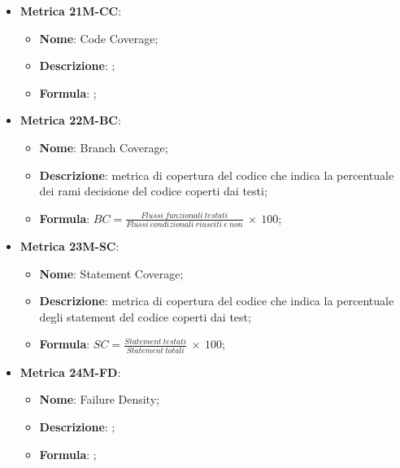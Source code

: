\begin{itemize}
    \item \textbf{Metrica 21M-CC}:
    \begin{itemize}
        \item \textbf{Nome}: Code Coverage;
        \item \textbf{Descrizione}: ;
        \item \textbf{Formula}: ;
    \end{itemize}
\end{itemize}

\begin{itemize}
    \item \textbf{Metrica 22M-BC}:
    \begin{itemize}
        \item \textbf{Nome}: Branch Coverage;
        \item \textbf{Descrizione}: metrica di copertura del codice che indica la percentuale dei rami decisione del codice coperti dai testi;
        \item \textbf{Formula}: $BC =\frac{Flussi\:funzionali\: testati}{Flussi\:condizionali\: riusciti\: e\: non}\: \times \: 100$;
    \end{itemize}
\end{itemize}

\begin{itemize}
    \item \textbf{Metrica 23M-SC}:
    \begin{itemize}
        \item \textbf{Nome}: Statement Coverage;
        \item \textbf{Descrizione}: metrica di copertura del codice che indica la percentuale degli statement del codice coperti dai test;
        \item \textbf{Formula}: $SC = \frac{Statement\: testati}{Statement\: totali}\: \times \: 100$;
    \end{itemize}
\end{itemize}

\begin{itemize}
    \item \textbf{Metrica 24M-FD}:
    \begin{itemize}
        \item \textbf{Nome}: Failure Density;
        \item \textbf{Descrizione}: ;
        \item \textbf{Formula}: ;
    \end{itemize}
\end{itemize}

